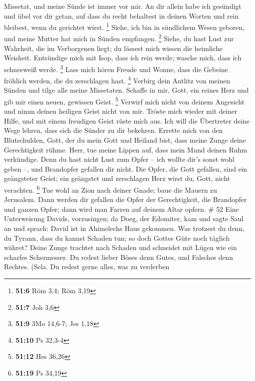 Missetat, und meine Sünde ist immer vor mir.  An dir
allein habe ich gesündigt und übel vor dir getan, auf dass du recht
behaltest in deinen Worten und rein bleibest, wenn du gerichtet wirst.
\footnote{\textbf{51:6} Röm 3,4; Röm 3,19}  Siehe, ich bin
in sündlichem Wesen geboren, und meine Mutter hat mich in Sünden
empfangen. \footnote{\textbf{51:7} Joh 3,6}  Siehe, du
hast Lust zur Wahrheit, die im Verborgenen liegt; du lässest mich wissen
die heimliche Weisheit.  Entsündige mich mit Isop, dass
ich rein werde; wasche mich, dass ich schneeweiß werde. \footnote{\textbf{51:9}
  3Mo 14,6-7; Jes 1,18}  Lass mich hören Freude und
Wonne, dass die Gebeine fröhlich werden, die du zerschlagen hast.
\footnote{\textbf{51:10} Ps 32,3-4}  Verbirg dein Antlitz
von meinen Sünden und tilge alle meine Missetaten. 
Schaffe in mir, Gott, ein reines Herz und gib mir einen neuen, gewissen
Geist. \footnote{\textbf{51:12} Hes 36,26}  Verwirf mich
nicht von deinem Angesicht und nimm deinen heiligen Geist nicht von mir.
 Tröste mich wieder mit deiner Hilfe, und mit einem
freudigen Geist rüste mich aus.  Ich will die Übertreter
deine Wege lehren, dass sich die Sünder zu dir bekehren. 
Errette mich von den Blutschulden, Gott, der du mein Gott und Heiland
bist, dass meine Zunge deine Gerechtigkeit rühme.  Herr,
tue meine Lippen auf, dass mein Mund deinen Ruhm verkündige.
 Denn du hast nicht Lust zum Opfer -- ich wollte dir's
sonst wohl geben --, und Brandopfer gefallen dir nicht. 
Die Opfer, die Gott gefallen, sind ein geängsteter Geist; ein geängstet
und zerschlagen Herz wirst du, Gott, nicht verachten. \footnote{\textbf{51:19}
  Ps 34,19}  Tue wohl an Zion nach deiner Gnade; baue die
Mauern zu Jerusalem.  Dann werden dir gefallen die Opfer
der Gerechtigkeit, die Brandopfer und ganzen Opfer; dann wird man Farren
auf deinem Altar opfern. \# 52  Eine Unterweisung Davids,
vorzusingen;  da Doeg, der Edomiter, kam und sagte Saul an
und sprach: David ist in Ahimelechs Haus gekommen.  Was
trotzest du denn, du Tyrann, dass du kannst Schaden tun; so doch Gottes
Güte noch täglich währet?  Deine Zunge trachtet nach
Schaden und schneidet mit Lügen wie ein scharfes Schermesser.
 Du redest lieber Böses denn Gutes, und Falsches denn
Rechtes. (Sela.  Du redest gerne alles, was zu verderben

